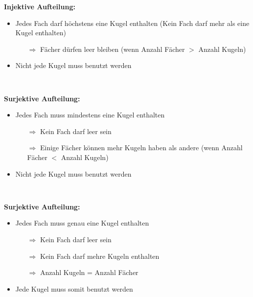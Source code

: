 \textbf{Injektive Aufteilung:}


\begin{itemize}[leftmargin=*]
\item Jedes Fach darf höchstens eine Kugel enthalten (Kein Fach darf mehr als eine Kugel enthalten)
\begin{itemize}
\item[$\Rightarrow$] Fächer dürfen leer bleiben (wenn Anzahl Fächer $>$ Anzahl Kugeln)
\end{itemize}
\item Nicht jede Kugel muss benutzt werden
\end{itemize}\

\textbf{Surjektive Aufteilung:}

\begin{itemize}[leftmargin=*]
\item Jedes Fach muss mindestens eine Kugel enthalten
\begin{itemize}
\item[$\Rightarrow$] Kein Fach darf leer sein
\item[$\Rightarrow$] Einige Fächer können mehr Kugeln haben als andere (wenn Anzahl Fächer $<$ Anzahl Kugeln)
\end{itemize}
\item Nicht jede Kugel muss benutzt werden
\end{itemize}\

\textbf{Surjektive Aufteilung:}

\begin{itemize}[leftmargin=*]
\item Jedes Fach muss genau eine Kugel enthalten
\begin{itemize}
\item[$\Rightarrow$] Kein Fach darf leer sein
\item[$\Rightarrow$] Kein Fach darf mehre Kugeln enthalten
\item[$\Rightarrow$] Anzahl Kugeln = Anzahl Fächer
\end{itemize}
\item Jede Kugel muss somit benutzt werden
\end{itemize}\

